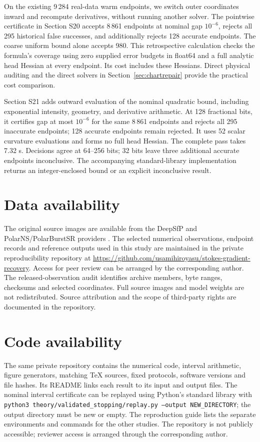 \documentclass[pdflatex,sn-mathphys-num]{sn-jnl}
\begin{document}
On the existing 9\,284 real-data warm endpoints, we switch outer coordinates inward and recompute derivatives, without running another solver. The pointwise certificate in Section S20 accepts 8\,861 endpoints at nominal gap $10^{-6}$, rejects all 295 historical false successes, and additionally rejects 128 accurate endpoints. The coarse uniform bound alone accepts 980. This retrospective calculation checks the formula's coverage using zero supplied error budgets in float64 and a full analytic head Hessian at every endpoint. Its cost includes these Hessians. Direct physical auditing and the direct solvers in Section~\ref{sec:chartrepair} provide the practical cost comparison.

Section S21 adds outward evaluation of the nominal quadratic bound, including exponential intensity, geometry, and derivative arithmetic. At 128 fractional bits, it certifies gap at most $10^{-6}$ for the same 8\,861 endpoints and rejects all 295 inaccurate endpoints; 128 accurate endpoints remain rejected. It uses 52 scalar curvature evaluations and forms no full head Hessian. The complete pass takes 7.32 s. Decisions agree at 64--256 bits; 32 bits leave three additional accurate endpoints inconclusive. The accompanying standard-library implementation returns an integer-enclosed bound or an explicit inconclusive result.

\section*{Data availability}
The original source images are available from the DeepSfP and PolarNS/PolarBurstSR providers \cite{ba,polarns}. The selected numerical observations, endpoint records and reference outputs used in this study are maintained in the private reproducibility repository at \url{https://github.com/usamihiroyasu/stokes-gradient-recovery}. Access for peer review can be arranged by the corresponding author. The released-observation audit identifies archive members, byte ranges, checksums and selected coordinates. Full source images and model weights are not redistributed. Source attribution and the scope of third-party rights are documented in the repository.

\section*{Code availability}
The same private repository contains the numerical code, interval arithmetic, figure generators, matching TeX sources, fixed protocols, software versions and file hashes. Its README links each result to its input and output files. The nominal interval certificate can be replayed using Python's standard library with \texttt{python3 theory/validated\_stopping/replay.py --output NEW\_DIRECTORY}; the output directory must be new or empty. The reproduction guide lists the separate environments and commands for the other studies. The repository is not publicly accessible; reviewer access is arranged through the corresponding author.
\end{document}
